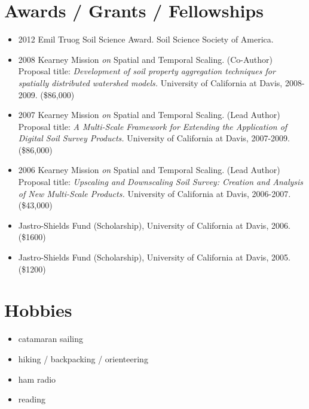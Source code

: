 \documentclass[overlapped,line,10pt,letterpaper]{res}
\begin{document}
\begin{resume}
\section{\bf Awards / Grants / Fellowships}

\begin{itemize}
\item 2012 Emil Truog Soil Science Award. Soil Science Society of America.

\item 2008 Kearney Mission \textit{on} Spatial and Temporal Scaling. (Co-Author) \\
Proposal title: \textit{Development of soil property aggregation techniques for spatially distributed watershed models.} 
University of California at Davis, 2008-2009. (\$86,000)

\item 2007 Kearney Mission \textit{on} Spatial and Temporal Scaling. (Lead Author) \\
Proposal title: \textit{A Multi-Scale Framework for Extending the Application of Digital Soil Survey Products.} 
University of California at Davis, 2007-2009. (\$86,000)

\item 2006 Kearney Mission \textit{on} Spatial and Temporal Scaling. (Lead Author) \\
Proposal title: \textit{Upscaling and Downscaling Soil Survey: Creation and Analysis of New Multi-Scale Products.} 
University of California at Davis, 2006-2007. (\$43,000)

\item Jastro-Shields Fund (Scholarship), University of California at Davis, 2006. (\$1600)

\item Jastro-Shields Fund (Scholarship), University of California at Davis, 2005. (\$1200)
\end{itemize}


\section{\bf Hobbies}
\begin{itemize}
	\item catamaran sailing
	\item hiking / backpacking / orienteering
	\item ham radio
	\item reading
\end{itemize}



\end{resume}
\end{document}
